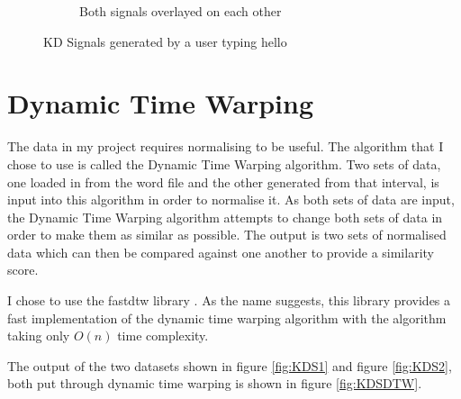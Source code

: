 \documentclass[10pt,a4paper]{report}
\begin{document}
\begin{figure}
\begin{subfigure}[b]{0.3\textwidth}
		\caption{Both signals overlayed on each other}
		\label{fig:KDSBoth}
	\end{subfigure}
	\caption{KD Signals generated by a user typing hello}
	\label{fig:KDS}
\end{figure}

\section{Dynamic Time Warping}

The data in my project requires normalising to be useful. The algorithm that I chose to use is called the Dynamic Time Warping algorithm\cite{Salvador2004FastDTWTA}. Two sets of data, one loaded in from the word file and the other generated from that interval, is input into this algorithm in order to normalise it. As both sets of data are input, the Dynamic Time Warping algorithm attempts to change both sets of data in order to make them as similar as possible. The output is two sets of normalised data which can then be compared against one another to provide a similarity score. 

I chose to use the fastdtw library \cite{tandi_2015}. As the name suggests, this library provides a fast implementation of the dynamic time warping algorithm with the algorithm taking only \(O(n)\) time complexity\cite{tandi_2015}.

The output of the two datasets shown in figure \ref{fig:KDS1} and figure \ref{fig:KDS2}, both put through dynamic time warping is shown in figure \ref{fig:KDSDTW}.
\end{document}
